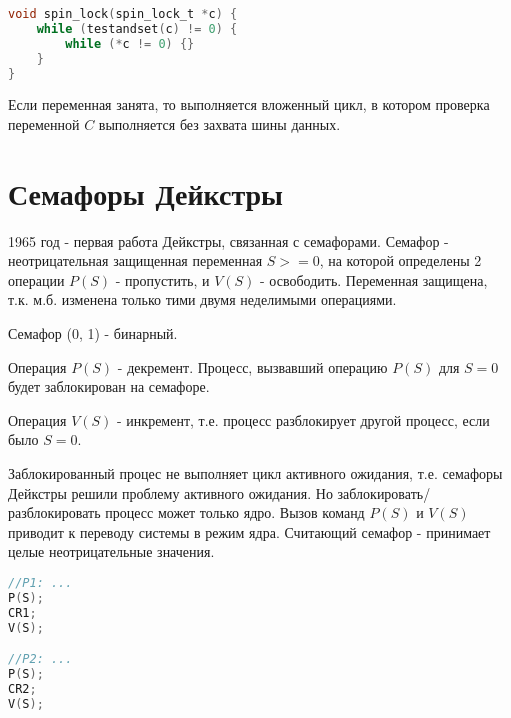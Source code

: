 \begin{lstlisting}[language=c]
void spin_lock(spin_lock_t *c) {
	while (testandset(c) != 0) {
		while (*c != 0) {}
	}
}
\end{lstlisting}

Если переменная занята, то выполняется вложенный цикл, в котором проверка переменной $C$  выполняется без захвата шины данных.

\section{Семафоры Дейкстры}

1965 год - первая работа Дейкстры, связанная с семафорами. Семафор - неотрицательная защищенная переменная $S >= 0$, на которой определены 2 операции $P(S)$ - пропустить, и $V(S)$ - освободить. Переменная защищена, т.к. м.б. изменена только тими двумя неделимыми операциями.

Семафор (0, 1) - бинарный.

Операция $P(S)$ - декремент. Процесс, вызвавший операцию $P(S)$ для $S = 0$ будет заблокирован на семафоре.

Операция $V(S)$ - инкремент, т.е. процесс разблокирует другой процесс, если было $S=0$.

Заблокированный процес не выполняет цикл активного ожидания, т.е. семафоры Дейкстры решили проблему активного ожидания. Но заблокировать/разблокировать процесс может только ядро. Вызов команд $P(S)$ и $V(S)$ приводит к переводу системы в режим ядра. Считающий семафор - принимает целые неотрицательные значения.

\begin{lstlisting}[language=c]
//P1: ...
P(S);
CR1;
V(S);

//P2: ...
P(S);
CR2;
V(S);
\end{lstlisting}
